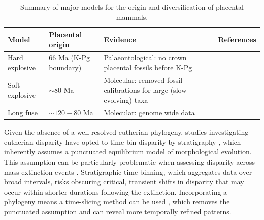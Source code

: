 \documentclass[titlepage]{article}
\begin{document}
\begin{table}[htbp]
    \centering
    \caption{Summary of major models for the origin and diversification of placental mammals.}
    \begin{tabularx}{\textwidth}{|p{3cm}|p{3.5cm}|X|p{4cm}|}
        \hline
        \textbf{Model} & \textbf{Placental origin} & \textbf{} \textbf{Evidence} & \textbf{References} \\
        \hline
        Hard explosive & 66 Ma (K-Pg boundary)  & Palaeontological: no crown placental fossils before K-Pg & \cite{alroy_fossil_1999,oleary_placental_2013,davies2017completeness,halliday_resolving_2017} \\
         \hline
        Soft explosive & $\sim{80}$ Ma & Molecular: removed fossil calibrations for large (slow evolving) taxa & \cite{phillips_geomolecular_2016,phillips_soft_2018} \\
        \hline
        Long fuse & $\sim{120-80}$ Ma & Molecular: genome wide data & \cite{archibald_quantitative_2001,meredith_impacts_2011,dos_reis_phylogenomic_2012,foley_mammal_2016,carlisle_timescale_2023} \\
        \hline
    \end{tabularx}
    \label{tab:placental_models}
\end{table}

Given the absence of a well-resolved eutherian phylogeny, studies investigating eutherian disparity have opted to time-bin disparity by stratigraphy \citep{grossnickle_mammal_2013,wilson_mammals_2013, grossnickle_therian_2016,benevento_patterns_2019}, which inherently assumes a punctuated equilibrium model of morphological evolution. 
This assumption can be particularly problematic when assessing disparity across mass extinction events \citep{guillerme2018time}. 
Stratigraphic time binning, which aggregates data over broad intervals, risks obscuring critical, transient shifts in disparity that may occur within shorter durations following the extinction. 
Incorporating a phylogeny means a time-slicing method can be used \citep{guillerme2018time}, which removes the punctuated assumption and can reveal more temporally refined patterns.
\end{document}
